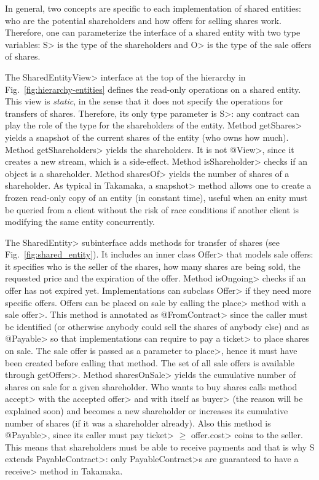 In general, two concepts are specific to each implementation of shared entities:
who are the potential shareholders and how offers for selling shares work.
Therefore, one can parameterize the interface of a shared entity with two type variables:
\<S> is the type of the shareholders and \<O> is the type of the sale offers of shares.

The \<SharedEntityView> interface at the top of the hierarchy in Fig.~\ref{fig:hierarchy-entities}
defines the read-only operations on a shared entity. This view is \emph{static}, in the sense that it
does not specify the operations for transfers of shares. Therefore, its only type parameter is \<S>:
any contract can play the role of the type for the shareholders of the entity.
Method \<getShares> yields a snapshot of the
current shares of the entity (who owns how much). Method \<getShareholders> yields the shareholders.
It is not \<@View>, since it creates a new stream, which is a side-effect.
Method \<isShareholder> checks if an object is a shareholder. Method \<sharesOf> yields
the number of shares of a shareholder. As typical in Takamaka, a \<snapshot> method allows one
to create a frozen read-only copy of an entity (in constant time), useful when an enity must be queried from
a client without the risk of race conditions if another client is modifying the same entity concurrently.

The \<SharedEntity> subinterface adds methods for transfer of shares
(see Fig.~\ref{fig:shared_entity}).
It includes an inner class \<Offer> that models sale offers:
it specifies who is the seller of the shares,
how many shares are being sold, the requested price and the expiration of the offer.
Method \<isOngoing> checks if an offer has not expired yet.
Implementations can subclass \<Offer> if they need more specific offers.
Offers can be placed on sale
by calling the \<place> method with a sale \<offer>.
This method is annotated as \<@FromContract> since the caller must be
identified (or otherwise anybody could sell the shares of anybody else) and
as \<@Payable> so that implementations can require
to pay a \<ticket> to place shares on sale.
The sale offer is passed as a parameter to \<place>, hence it must have been created before calling that method.
The set of all sale offers is available through \<getOffers>. Method \<sharesOnSale> yields the
cumulative number of shares on sale for a given shareholder.
Who wants to buy shares calls method \<accept> with the accepted \<offer>
and with itself as \<buyer> (the reason will be explained soon)
and becomes a new shareholder or increases
its cumulative number of shares (if it was a shareholder already).
Also this method is \<@Payable>, since its caller must pay \<ticket> $\ge$ \<offer.cost>
coins to the seller.
This means that shareholders must be able to receive payments and that
is why \<S extends PayableContract>: only \<PayableContract>s are guaranteed to have a
\<receive> method in Takamaka.


